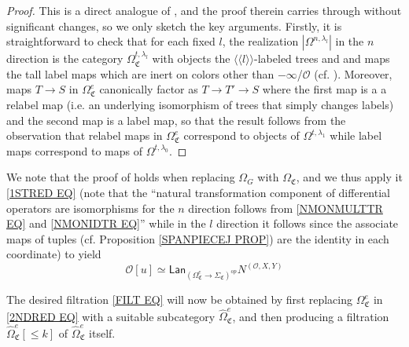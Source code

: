 \documentclass[a4paper,10pt
,draft
]{article}%
\numberwithin{equation}{section}
\numberwithin{figure}{section}
\theoremstyle{definition} %
\renewcommand{\O}{\ensuremath{\mathcal O}}
\newcommand{\1}{\ensuremath{\mathbbm 1}}%
\begin{document}
\begin{proof}
This is a direct analogue of \cite[Prop. 5.41]{BP_geo}, and the proof therein carries through without significant changes, so we only sketch the key arguments.
Firstly, it is straightforward to check that for each fixed $l$,
the realization $|\Omega^{n,\lambda_l}|$
in the $n$ direction is the category 
$\Omega^{t,\lambda_l}_{\mathfrak{C}}$
with objects the $\langle \langle l \rangle \rangle$-labeled trees and and maps the tall label maps which are inert on colors other than $-\infty$/$\O$ (cf. \cite[Rem. 5.36]{BP_geo}).
Moreover, maps 
$T \to S$
in 
$\Omega^e_{\mathfrak{C}}$
canonically factor 
as
$T \to T' \to S$
where the first map is a a relabel map (i.e. an underlying isomorphism of trees that simply changes labels) and the second map is a label map, 
so that the result follows from the observation that relabel maps in 
$\Omega^e_{\mathfrak{C}}$
correspond to objects of  
$\Omega^{t,\lambda_1}$
while label maps correspond to maps of
$\Omega^{t,\lambda_0}$.
\end{proof}


We note that the proof of \cite[Prop 5.37]{BP_geo} %
holds when replacing $\Omega_G$ with $\Omega_{\mathfrak C}$,
and we thus 
apply it
\eqref{1STRED EQ}
(note that the ``natural transformation component of differential operators are isomorphisms for the $n$ direction follows from \eqref{NMONMULTTR EQ} and \eqref{NMONIDTR EQ}''
while in the $l$ direction it follows since the associate maps of tuples (cf. Proposition \ref{SPANPIECEJ PROP}) are the identity in each coordinate)
to yield
\begin{equation}\label{2NDRED EQ}
\O[u] \simeq
	\mathsf{Lan}_{\left(\Omega_{\mathfrak C}^{e} \to
	\Sigma_{\mathfrak C}\right)^{op}} N^{(\O,X,Y)}
\end{equation}

The desired filtration \eqref{FILT EQ} will now be obtained by
first replacing $\Omega_{\mathfrak C}^e$ in \eqref{2NDRED EQ} with a suitable subcategory $\widehat{\Omega}_{\mathfrak C}^{e}$,
and then producing a filtration
$\widehat{\Omega}_{\mathfrak C}^{e}[\leq k]$
of 
$\widehat{\Omega}_{\mathfrak C}^{e}$ itself.

\end{document}
